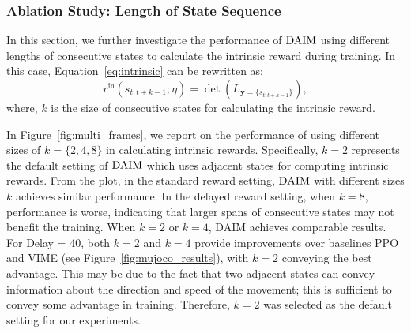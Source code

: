 \subsubsection{Ablation Study: Length of State Sequence}
In this section, we further investigate the performance of $\text{DAIM}$ using different lengths of consecutive states to calculate the intrinsic reward during training. In this case, Equation~\eqref{eq:intrinsic} can be rewritten as:
\begin{equation}
    r^{\text{in}}(s_{t:t+k-1}; \eta) = \det\left(L_{\bm{y}=\{s_{t:t+k-1}\}}\right),
\label{eq:intrinsic_multi_frame}
\end{equation}
where, $k$ is the size of consecutive states for calculating the intrinsic reward.

In Figure~\ref{fig:multi_frames}, we report on the performance of using different sizes of $k=\{2, 4, 8\}$ in calculating intrinsic rewards.  Specifically, $k=2$ represents the default setting of $\text{DAIM}$ which uses adjacent states for computing intrinsic rewards. From the plot, in the standard reward setting, $\text{DAIM}$ with different sizes $k$ achieves similar performance. In the delayed reward setting, when $k=8$, performance is worse, indicating that larger spans of consecutive states may not benefit the training. When $k=2$ or $k=4$, DAIM achieves comparable results. For Delay = 40, both $k=2$ and $k=4$ provide improvements over baselines PPO and VIME (see Figure~\ref{fig:mujoco_results}), with $k=2$ conveying the best advantage. This may be due to the fact that two adjacent states can convey information about the direction and speed of the movement; this is sufficient to convey some advantage in training. Therefore, $k=2$ was selected as the default setting for our experiments.

